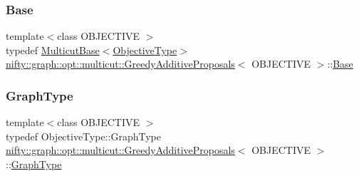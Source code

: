 \subsubsection{\texorpdfstring{Base}{Base}}
{\footnotesize\ttfamily template$<$class O\+B\+J\+E\+C\+T\+I\+VE $>$ \\
typedef \hyperlink{classnifty_1_1graph_1_1opt_1_1multicut_1_1MulticutBase}{Multicut\+Base}$<$\hyperlink{classnifty_1_1graph_1_1opt_1_1multicut_1_1GreedyAdditiveProposals_a8b28464e490d224a3626680692ac2170}{Objective\+Type}$>$ \hyperlink{classnifty_1_1graph_1_1opt_1_1multicut_1_1GreedyAdditiveProposals}{nifty\+::graph\+::opt\+::multicut\+::\+Greedy\+Additive\+Proposals}$<$ O\+B\+J\+E\+C\+T\+I\+VE $>$\+::\hyperlink{classnifty_1_1graph_1_1opt_1_1multicut_1_1GreedyAdditiveProposals_a058a440d88f840a245fdc792d47611d5}{Base}}

\mbox{\label{classnifty_1_1graph_1_1opt_1_1multicut_1_1GreedyAdditiveProposals_a059ec39cbdde7294a76dac00d102e209}} 
\subsubsection{\texorpdfstring{Graph\+Type}{GraphType}}
{\footnotesize\ttfamily template$<$class O\+B\+J\+E\+C\+T\+I\+VE $>$ \\
typedef Objective\+Type\+::\+Graph\+Type \hyperlink{classnifty_1_1graph_1_1opt_1_1multicut_1_1GreedyAdditiveProposals}{nifty\+::graph\+::opt\+::multicut\+::\+Greedy\+Additive\+Proposals}$<$ O\+B\+J\+E\+C\+T\+I\+VE $>$\+::\hyperlink{classnifty_1_1graph_1_1opt_1_1multicut_1_1GreedyAdditiveProposals_a059ec39cbdde7294a76dac00d102e209}{Graph\+Type}}

\mbox{\label{classnifty_1_1graph_1_1opt_1_1multicut_1_1GreedyAdditiveProposals_a4097016ca99d6d2aab8f3a8a9432f001}} 
